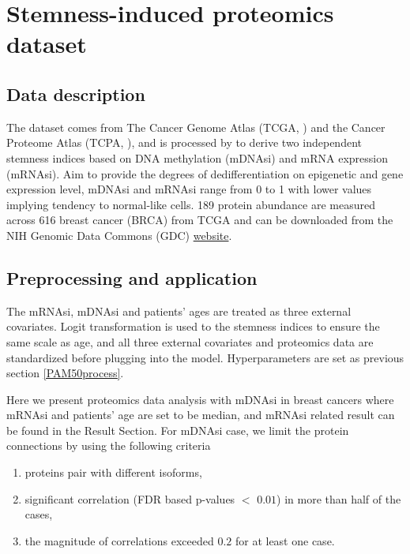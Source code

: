 \documentclass[
]{book}
\begin{document}
\hypertarget{StemnessBC}{%
\chapter{Stemness-induced proteomics dataset}\label{StemnessBC}}

\hypertarget{StemnessBCdata}{%
\section{Data description}\label{StemnessBCdata}}

The dataset comes from The Cancer Genome Atlas (TCGA, \citet{weinstein2013cancer}) and the Cancer Proteome Atlas (TCPA, \citet{li2013tcpa}), and is processed by \citet{malta2018machine} to derive two independent stemness indices based on DNA methylation (mDNAsi) and mRNA expression (mRNAsi). Aim to provide the degrees of dedifferentiation on epigenetic and gene expression level, mDNAsi and mRNAsi range from 0 to 1 with lower values implying tendency to normal-like cells. 189 protein abundance are measured across 616 breast cancer (BRCA) from TCGA \citep{weinstein2013cancer} and can be downloaded from the NIH Genomic Data Commons (GDC) \href{https://gdc.cancer.gov/about-data/publications/PanCanStemness-2018}{website}.

\hypertarget{StemnessBCprocess}{%
\section{Preprocessing and application}\label{StemnessBCprocess}}

The mRNAsi, mDNAsi and patients' ages are treated as three external covariates. Logit transformation is used to the stemness indices to ensure the same scale as age, and all three external covariates and proteomics data are standardized before plugging into the model. Hyperparameters are set as previous section \ref{PAM50process}.

Here we present proteomics data analysis with mDNAsi in breast cancers where mRNAsi and patients' age are set to be median, and mRNAsi related result can be found in the Result Section. For mDNAsi case, we limit the protein connections by using the following criteria

\begin{enumerate}
\def\labelenumi{(\arabic{enumi})}
\item
  proteins pair with different isoforms,
\item
  significant correlation (FDR based p-values \(<\) \(0.01\)) in more than half of the cases,
\item
  the magnitude of correlations exceeded \(0.2\) for at least one case.
\end{enumerate}
\end{document}
